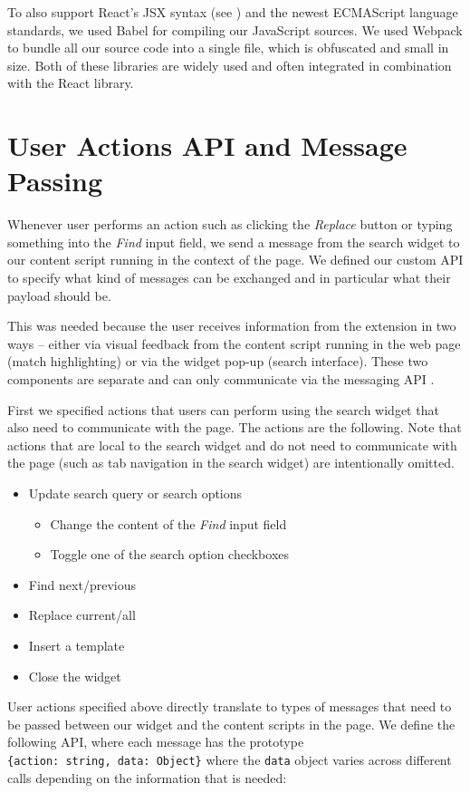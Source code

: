 \documentclass[bsc,frontabs,twoside,singlespacing,parskip,deptreport]{infthesis}
\providecommand{\tightlist}{%
  \setlength{\itemsep}{0pt}\setlength{\parskip}{0pt}}
\begin{document}
To also support React's JSX syntax (see \cite{A5}) and the newest ECMAScript language standards, we used Babel \cite{A6} for compiling our JavaScript sources. We used Webpack \cite{A7} to bundle all our source code into a single file, which is obfuscated and small in size. Both of these libraries are widely used and often integrated in combination with the React library.

\section{User Actions API and Message Passing}
Whenever user performs an action such as clicking the \textit{Replace} button or typing something into the \textit{Find} input field, we send a message from the search widget to our content script running in the context of the page. We defined our custom API to specify what kind of messages can be exchanged and in particular what their payload should be.

This was needed because the user receives information from the extension in two ways -- either via visual feedback from the content script running in the web page (match highlighting) or via the widget pop-up (search interface). These two components are separate and can only communicate via the messaging API \cite{C5}.

First we specified actions that users can perform using the search widget that also need to communicate with the page. The actions are the following. Note that actions that are local to the search widget and do not need to communicate with the page (such as tab navigation in the search widget) are intentionally omitted.

\begin{itemize}
\tightlist
\item
  Update search query or search options
  \begin{itemize}
  \tightlist
  \item
    Change the content of the \textit{Find} input field
  \item
    Toggle one of the search option checkboxes
  \end{itemize}
\item
  Find next/previous
\item
  Replace current/all
\item
  Insert a template
\item
  Close the widget
\end{itemize}

User actions specified above directly translate to types of messages
that need to be passed between our widget and the content scripts in the page. We define the following API, where each message has the prototype \texttt{\{action:\ string,\ data:\ Object\}} where the \texttt{data} object varies across different calls depending on the information that is needed: \\[10pt]
\end{document}
